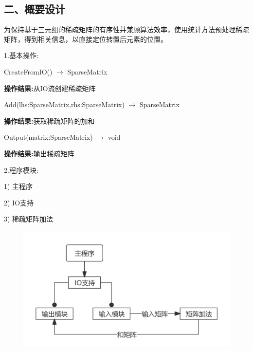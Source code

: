 \documentclass[UTF8, a4paper]{ctexart}
\begin{document}
\subsection*{二、概要设计}
为保持基于三元组的稀疏矩阵的有序性并兼顾算法效率，使用统计方法预处理稀疏矩阵，得到相关信息，以直接定位转置后元素的位置。 \par
1.\;基本操作: \par
	CreateFromIO() $\rightarrow$ SparseMatrix \par
	\qquad\textbf{操作结果:}\;从IO流创建稀疏矩阵 \par
	Add(lhs:SparseMatrix,rhs:SparseMatrix) $\rightarrow$ SparseMatrix \par
	\qquad\textbf{操作结果:}\;获取稀疏矩阵的加和 \par
	Output(matrix:SparseMatrix) $\rightarrow$ void \par
	\qquad\textbf{操作结果:}\;输出稀疏矩阵 \par
2.\;程序模块: \par
1) 主程序 \par
2) IO支持 \par
3) 稀疏矩阵加法 \par
\begin{figure}[H]
	\begin{minipage}[t]{\linewidth}
		\centering
		\includegraphics[width=125mm,height=64mm]{./assets/DS04-1}
	\end{minipage}
\end{figure}
\end{document}

